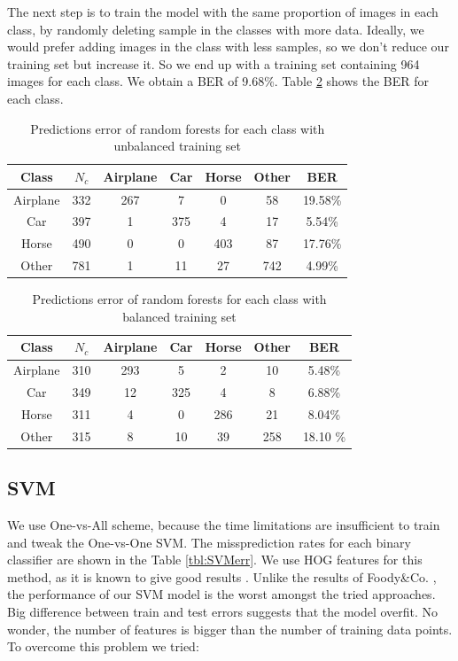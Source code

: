 \documentclass{article} %
\begin{document}
The next step is to train the model with the same proportion of images in each class, by randomly deleting sample in the classes with more data. Ideally, we would prefer adding images in the class with less samples, so we don't reduce our training set but increase it.
So we end up with a training set containing 964 images for each class. 
We obtain a BER of 9.68\%. Table \ref{tbl:errClassBal} shows the BER for each class.

\begin{table}[!htb]
	\centering
		\begin{tabular}{|c|c|c|c|c|c|c|}
			\hline Class & $N_{c}$ & Airplane & Car & Horse & Other & BER \\ 
			\hline Airplane & 332 & 267 & 7 & 0 & 58 & 19.58\% \\ 
			\hline Car & 397 & 1 & 375 & 4 & 17 & 5.54\% \\ 
			\hline Horse & 490 & 0 & 0 & 403 & 87 & 17.76\% \\ 
			\hline Other & 781 & 1 & 11 & 27 & 742 & 4.99\% \\ 
			\hline 
		\end{tabular} 
		\caption{Predictions error of random forests for each class with unbalanced training set}
		\label{tbl:errClassNotBal}
\end{table}

\begin{table}
	\centering
	\begin{tabular}{|c|c|c|c|c|c|c|}
		\hline Class & $N_{c}$ & Airplane & Car & Horse & Other & BER \\ 
		\hline Airplane & 310 & 293 & 5 & 2 & 10 & 5.48\% \\ 
		\hline Car & 349 & 12 & 325 & 4 & 8 & 6.88\% \\ 
		\hline Horse & 311 & 4 & 0 & 286 & 21 & 8.04\% \\ 
		\hline Other & 315 & 8 & 10 & 39 & 258 & 18.10 \% \\ 
		\hline 
	\end{tabular} 
	\caption{Predictions error of random forests for each class with balanced training set}
	\label{tbl:errClassBal}
\end{table}


\subsection{SVM}

We use One-vs-All scheme, because the time limitations are insufficient to train and tweak the One-vs-One SVM. The missprediction rates for each binary classifier are shown in the Table \ref{tbl:SVMerr}. We use HOG features for this method, as it is known to give good results \cite{zhang2010pedestrian}. Unlike the results of Foody\&Co. \cite{foody2004relative}, the performance of our SVM model is the worst amongst the tried approaches. Big difference between train and test errors suggests that the model overfit. No wonder, the number of features is bigger than the number of training data points. To overcome this problem we tried:
\end{document}
